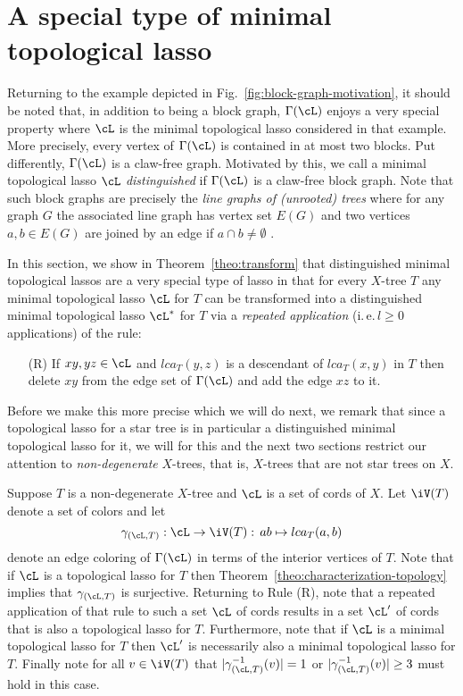 
\section{A special type of minimal topological lasso}
\label{sec:distinguished}

Returning to the example depicted in Fig.~\ref{fig:block-graph-motivation}, it
should be noted that, in addition to being a block graph, $\Gamma(\cL)$ enjoys
a very special property where $\cL$ is the minimal topological lasso
considered in that example. More precisely, every vertex of $\Gamma(\cL)$ is
contained in at most two blocks.  Put differently, $\Gamma(\cL)$ is a
claw-free graph. Motivated by this, we call a minimal topological lasso $\cL$
{\em distinguished} if $\Gamma(\cL)$ is a claw-free block graph.  Note that
such block graphs are precisely the {\em line graphs of (unrooted) trees}
where for any graph $G$ the associated line graph has vertex set $E(G)$ and
two vertices $a,b\in E(G)$ are joined by an edge if $a\cap b\not=\emptyset$
\cite{H72}.

In this section, we show in Theorem~\ref{theo:transform} that distinguished
minimal topological lassos are a very special type of lasso in that for every
$X$-tree $T$ any minimal topological lasso $\cL$ for $T$ can be transformed
into a distinguished minimal topological lasso $\cL^*$ for $T$ via a {\em
  repeated application} (i.\,e.\,$l\geq 0$ applications) of the rule:

\begin{enumerate}
\item[(R)] If $xy,yz\in \cL$ and $lca_T(y,z)$ is a descendant of $lca_T(x,y)$
  in $T$ then delete $xy$ from the edge set of $\Gamma(\cL)$ and add the edge
  $xz$ to it.
\end{enumerate}

Before we make this more precise which we will do next, we remark that since a
topological lasso for a star tree is in particular a distinguished minimal
topological lasso for it, we will for this and the next two sections restrict
our attention to {\em non-degenerate} $X$-trees, that is, $X$-trees that are
not star trees on $X$.

Suppose $T$ is a non-degenerate $X$-tree and $\cL$ is a set of cords of
$X$. Let $\iV(T)$ denote a set of colors and let
$$
\gamma_{(\cL,T)}:\cL\to \iV(T):\, ab\mapsto lca_T(a,b)
$$
denote an edge coloring of $\Gamma(\cL)$ in terms of the interior vertices of
$T$. Note that if $\cL$ is a topological lasso for $T$ then
Theorem~\ref{theo:characterization-topology} implies that $\gamma_{(\cL,T)}$
is surjective. Returning to Rule (R), note that a repeated application of that
rule to such a set $\cL$ of cords results in a set $\cL'$ of cords that is
also a topological lasso for $T$. Furthermore, note that if $\cL$ is a minimal
topological lasso for $T$ then $\cL'$ is necessarily also a minimal
topological lasso for $T$. Finally note for all $v\in \iV(T)$ that
$|\gamma_{(\cL,T)}^{-1}(v)|=1$ or $|\gamma_{(\cL,T)}^{-1}(v)|\geq 3$ must hold
in this case.


